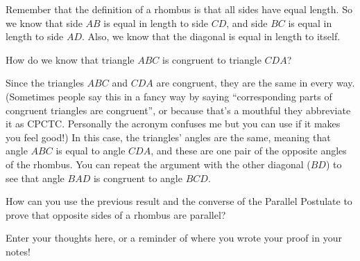 \documentclass{ximera}
\begin{document}
\begin{example}
\begin{center}
\end{center}
Remember that the definition of a rhombus is that all sides have equal length. So we know that side $AB$ is equal in length to side $CD$, and side $BC$ is equal in length to side $AD$. Also, we know that the diagonal is equal in length to itself.
\begin{question}
How do we know that triangle $ABC$ is congruent to triangle $CDA$?
\begin{multipleChoice}
\end{multipleChoice}
\end{question}
Since the triangles $ABC$ and $CDA$ are congruent, they are the same in every way. (Sometimes people say this in a fancy way by saying ``corresponding parts of congruent triangles are congruent'', or because that's a mouthful they abbreviate it as CPCTC. Personally the acronym confuses me but you can use if it makes you feel good!) In this case, the triangles' angles are the same, meaning that angle $ABC$ is equal to angle $CDA$, and these are one pair of the opposite angles of the rhombus. You can repeat the argument with the other diagonal ($BD$) to see that angle $BAD$ is congruent to angle $BCD$.

\end{example}


\begin{question}
How can you use the previous result and the converse of the Parallel Postulate to prove that opposite sides of a rhombus are parallel?
\begin{freeResponse}
Enter your thoughts here, or a reminder of where you wrote your proof in your notes!
\end{freeResponse}
\end{question}
\end{document}
